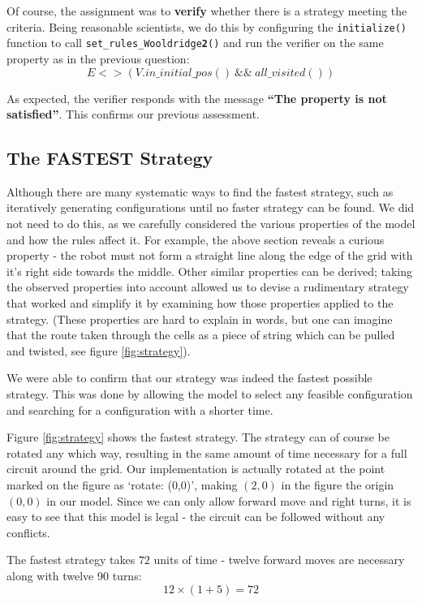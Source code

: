 \documentclass{article}
\begin{document}
Of course, the assignment was to \textbf{verify} whether there is a strategy meeting the criteria.
Being reasonable scientists, we do this by configuring the \texttt{initialize()} function to call \texttt{set\_rules\_Wooldridge\textbf{2}()} and run the verifier on the same property as in the previous question:
\[ E<>(V.in\_initial\_pos() ~ \&\& ~ all\_visited()) \]

As expected, the verifier responds with the message \textbf{``The property is not satisfied''}.
This confirms our previous assessment.

\subsection{The FASTEST Strategy}

Although there are many systematic ways to find the fastest strategy, such as iteratively generating configurations until no faster strategy can be found.
We did not need to do this, as we carefully considered the various properties of the model and how the rules affect it.
For example, the above section reveals a curious property \-- the robot must not form a straight line along the edge of the grid with it's right side towards the middle.
Other similar properties can be derived; taking the observed properties into account allowed us to devise a rudimentary strategy that worked and simplify it by examining how those properties applied to the strategy. 
(These properties are hard to explain in words, but one can imagine that the route taken through the cells as a piece of string which can be pulled and twisted, see figure \ref{fig:strategy}).

We were able to confirm that our strategy was indeed the fastest possible strategy. This was done by allowing the model to select any feasible configuration and searching for a configuration with a shorter time.

Figure \ref{fig:strategy} shows the fastest strategy. The strategy can of course be rotated any which way, resulting in the same amount of time necessary for a full circuit around the grid.
Our implementation is actually rotated at the point marked on the figure as `rotate: (0,0)', making $(2,0)$ in the figure the origin $(0,0)$ in our model.
Since we can only allow forward move and right turns, it is easy to see that this model is legal
\-- the circuit can be followed without any conflicts.

The fastest strategy takes $72$ units of time \-- twelve forward moves are necessary along with twelve 90\degree{} turns:
\[ 12 \times ( 1 + 5 ) = 72 \]
\end{document}

